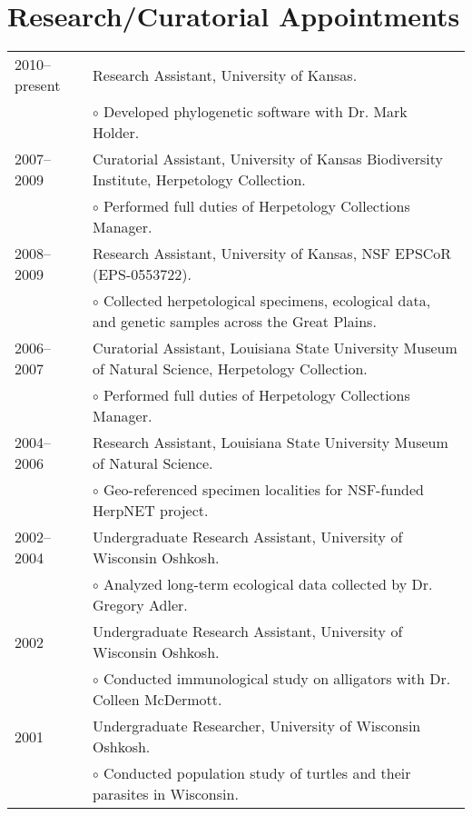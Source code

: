 \documentclass[10pt]{article}
\renewcommand{\labelitemi}{$\circ$}
\newcommand{\tableSubItem}{\addtolength{\leftskip}{1em} \labelitemi \xspace}
\begin{document}
\section*{Research/Curatorial Appointments}
\noindent\begin{tabulary}{\textwidth}{ @{} l L @{} }
2010--present & Research Assistant, University of Kansas. \\
            & \tableSubItem Developed phylogenetic software with Dr. Mark
              Holder. \\[0.25em]
2007--2009  & Curatorial Assistant, University of Kansas Biodiversity
              Institute, Herpetology Collection. \\
            & \tableSubItem Performed full duties of Herpetology Collections
              Manager. \\[0.25em]
2008--2009  & Research Assistant, University of Kansas, NSF EPSCoR
              (EPS-0553722). \\
            & \tableSubItem Collected herpetological specimens, ecological
              data, and genetic samples across the Great Plains. \\[0.25em]
2006--2007  & Curatorial Assistant, Louisiana State University Museum of
              Natural Science, Herpetology Collection. \\
            & \tableSubItem Performed full duties of Herpetology Collections
              Manager. \\[0.25em]
2004--2006  & Research Assistant, Louisiana State University Museum of Natural
              Science. \\
            & \tableSubItem Geo-referenced specimen localities for NSF-funded
              HerpNET project. \\[0.25em]
2002--2004  & Undergraduate Research Assistant, University of Wisconsin
              Oshkosh. \\
            & \tableSubItem Analyzed long-term ecological data collected by Dr.
              Gregory Adler. \\[0.25em]
2002        & Undergraduate Research Assistant, University of Wisconsin
              Oshkosh. \\
            & \tableSubItem Conducted immunological study on alligators with
              Dr. Colleen McDermott. \\[0.25em]
2001        & Undergraduate Researcher, University of Wisconsin Oshkosh. \\
            & \tableSubItem Conducted population study of turtles and their
              parasites in Wisconsin. \\
\end{tabulary}
\end{document}
